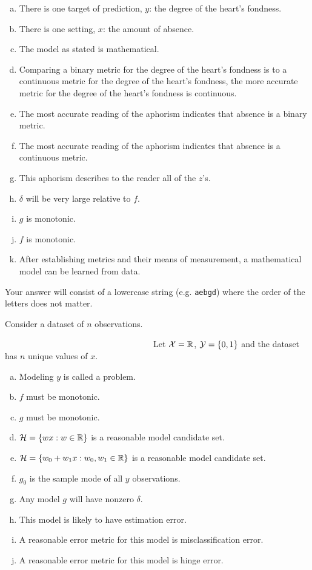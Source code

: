 \documentclass[12pt,landscape]{article}
\newcommand{\instr}{\small Your answer will consist of a lowercase string (e.g. \texttt{aebgd}) where the order of the letters does not matter. \normalsize}
\begin{document}
\begin{enumerate}[(a)]
\item There is one target of prediction, $y$: the degree of the heart's fondness.
\item There is one setting, $x$: the amount of absence.
\item The model as stated is mathematical. 
\item Comparing a binary metric for the degree of the heart's fondness is to a continuous metric for the degree of the heart's fondness, the more accurate metric for the degree of the heart's fondness is continuous.
\item The most accurate reading of the aphorism indicates that absence is a binary metric.
\item The most accurate reading of the aphorism indicates that absence is a continuous metric.
\item This aphorism describes to the reader all of the $z$'s.
\item $\delta$ will be very large relative to $f$.
\item $g$ is monotonic.
\item $f$ is monotonic.
\item After establishing metrics and their means of measurement, a mathematical model can be learned from data.
\end{enumerate}
\eenum\instr\pagebreak


\problem{} Consider a dataset of $n$ observations. 


\vspace{-0.2cm}\benum{} ~~~~~~~~~~~~~~~~~~~~~~~~~~~~~~~~~~~Let $\mathcal{X} = \mathbb{R}$, $\mathcal{Y} = \left\{0,1\right\}$ and the dataset has $n$ unique values of $x$.
\vspace{-0.1cm}
\begin{enumerate}[(a)]
\item Modeling $y$ is called a  problem.
\item $f$ must be monotonic.
\item $g$ must be monotonic.
\item $\mathcal{H} = \left\{w x : w \in \mathbb{R}\right\}$ is a reasonable model candidate set.
\item $\mathcal{H} = \left\{w_0 + w_1 x : w_0, w_1 \in \mathbb{R}\right\}$ is a reasonable model candidate set.
\item $g_0$ is the sample mode of all $y$ observations.
\item Any model $g$ will have nonzero $\delta$.
\item This model is likely to have estimation error.
\item A reasonable error metric for this model is misclassification error.
\item A reasonable error metric for this model is hinge error.
\end{enumerate}
\end{document}
